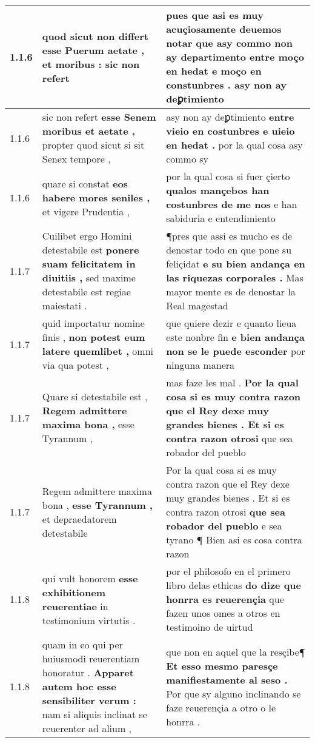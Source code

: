 \begin{tabular}{|p{1cm}|p{6.5cm}|p{6.5cm}|}
1.1.6 & quod sicut non differt \textbf{ esse Puerum aetate , et moribus : } sic non refert & pues que asi es muy acuçiosamente deuemos notar \textbf{ que asy commo non ay departimento entre moço en hedat e moço en constunbres . } asy non ay deꝑtimiento \\\hline
1.1.6 & sic non refert \textbf{ esse Senem moribus et aetate , } propter quod sicut si sit Senex tempore , & asy non ay deꝑtimiento \textbf{ entre vieio en costunbres e uieio en hedat . } por la qual cosa asy commo sy \\\hline
1.1.6 & quare si constat \textbf{ eos habere mores seniles , } et vigere Prudentia , & por la qual cosa si fuer çierto \textbf{ qualos mançebos han costunbres de me nos } e han sabiduria e entendimiento \\\hline
1.1.7 & Cuilibet ergo Homini detestabile est \textbf{ ponere suam felicitatem in diuitiis , } sed maxime detestabile est regiae maiestati . & ¶pres que assi es mucho es de denostar todo en que pone su feliçidat \textbf{ e su bien andança en las riquezas corporales . } Mas mayor mente es de denostar la Real magestad \\\hline
1.1.7 & quid importatur nomine finis , \textbf{ non potest eum latere quemlibet , } omni via qua potest , & que quiere dezir e quanto lieua este nonbre fin \textbf{ e bien andança non se le puede esconder } por ninguna manera \\\hline
1.1.7 & Quare si detestabile est , \textbf{ Regem admittere maxima bona , } esse Tyrannum , & mas faze les mal . \textbf{ Por la qual cosa si es muy contra razon que el Rey dexe muy grandes bienes . Et si es contra razon otrosi } que sea robador del pueblo \\\hline
1.1.7 & Regem admittere maxima bona , \textbf{ esse Tyrannum , } et depraedatorem detestabile & Por la qual cosa si es muy contra razon que el Rey dexe muy grandes bienes . Et si es contra razon otrosi \textbf{ que sea robador del pueblo } e sea tyrano ¶ Bien asi es cosa contra razon \\\hline
1.1.8 & qui vult honorem \textbf{ esse exhibitionem reuerentiae } in testimonium virtutis . & por el philosofo en el primero libro delas ethicas \textbf{ do dize que honrra es reuerençia } que fazen unos omes a otros en testimoino de uirtud \\\hline
1.1.8 & quam in eo qui per huiusmodi reuerentiam honoratur . \textbf{ Apparet autem hoc esse sensibiliter verum : } nam si aliquis inclinat se reuerenter ad alium , & que non en aquel que la resçibe¶ \textbf{ Et esso mesmo paresçe manifiestamente al seso . } Por que sy alguno inclinando se faze reuerençia a otro o le honrra . \\\hline

\end{tabular}
